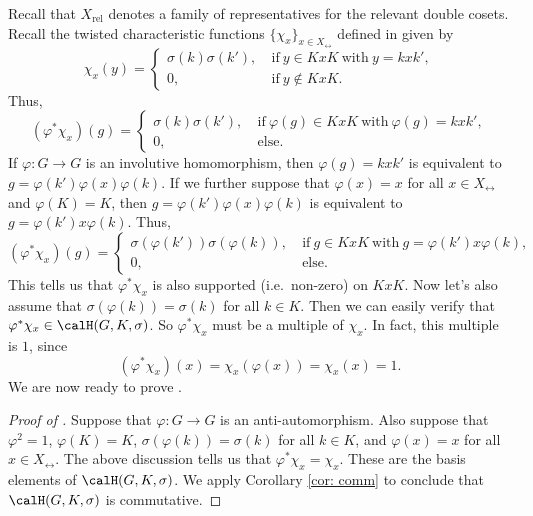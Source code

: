 Recall that $X_\mathrm{rel}$ denotes a family of representatives for the relevant double cosets.
Recall the twisted characteristic functions $\{\chi_x\}_{x\in X_\rel}$ defined in  given by
\[
    \chi_x(y) = \begin{cases}
        \sigma(k)\sigma(k'),\  & \text{if}\ y\in KxK\ \text{with}\ y=kxk', \\
        0,\                    & \text{if}\ y\notin KxK.
    \end{cases}
\]
Thus,
\[
    (\varphi^\ast\chi_x)(g) = \begin{cases}
        \sigma(k)\sigma(k'),\  & \text{if}\ \varphi(g) \in KxK\ \text{with}\ \varphi(g) = kxk', \\
        0,\                    & \text{else}.
    \end{cases}
\]
If $\varphi\colon G\to G$ is an involutive homomorphism, then $\varphi(g) = kxk'$ is equivalent to $g=\varphi(k')\varphi(x)\varphi(k)$.
If we further suppose that $\varphi(x)=x$ for all $x\in X_\rel$ and $\varphi(K)=K$, then $g=\varphi(k')\varphi(x)\varphi(k)$ is equivalent to $g=\varphi(k')x\varphi(k)$.
Thus,
\[
    (\varphi^\ast\chi_x)(g) = \begin{cases}
        \sigma(\varphi(k'))\sigma(\varphi(k)),\  & \text{if}\ g \in KxK\ \text{with}\ g = \varphi(k')x\varphi(k), \\
        0,\                                      & \text{else}.
    \end{cases}
\]
This tells us that $\varphi^\ast\chi_x$ is also supported (i.e.\ non-zero) on $KxK$.
Now let's also assume that $\sigma(\varphi(k))=\sigma(k)$ for all $k\in K$.
Then we can easily verify that $\varphi^\ast\chi_x \in \calH(G,K,\sigma)$.
So $\varphi^\ast\chi_x$ must be a multiple of $\chi_x$.
In fact, this multiple is $1$, since
\[
    (\varphi^\ast\chi_x)(x) = \chi_x(\varphi(x)) = \chi_x(x) = 1.
\]
We are now ready to prove .
\begin{proof}[Proof of ]
    Suppose that $\varphi\colon G\to G$ is an anti-automorphism.
    Also suppose that $\varphi^2=1$, $\varphi(K)=K$, $\sigma(\varphi(k))=\sigma(k)$ for all $k\in K$, and $\varphi(x)=x$ for all $x\in X_\rel$.
    The above discussion tells us that $\varphi^\ast \chi_x = \chi_x$.
    These are the basis elements of $\calH(G,K,\sigma)$.
    We apply Corollary \ref{cor: comm} to conclude that $\calH(G,K,\sigma)$ is commutative.
\end{proof}


